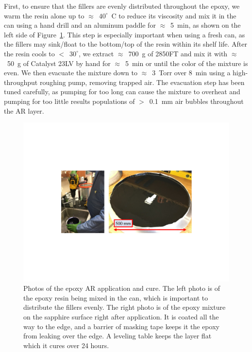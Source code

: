 First, to ensure that the fillers are evenly distributed throughout the epoxy, we warm the resin alone up to $\approx$~$40^{\circ}$~C to reduce its viscosity and mix it in the can using a hand drill and an aluminum paddle for $\approx$~5~min, as shown on the left side of Figure~\ref{fig:epoxy_curing}. This step is especially important when using a fresh can, as the fillers may sink/float to the bottom/top of the resin within its shelf life. After the resin cools to $<$~$30^{\circ}$, we extract $\approx$~700~g of 2850FT and mix it with $\approx$~50~g of Catalyst 23LV by hand for $\approx$~5~min or until the color of the mixture is even. We then evacuate the mixture down to $\approx$~3~Torr over 8~min using a high-throughput roughing pump, removing trapped air. The evacuation step has been tuned carefully, as pumping for too long can cause the mixture to overheat and pumping for too little results populations of $>$~0.1~mm air bubbles throughout the AR layer.

\begin{figure}[!t]
    \centering
    \includegraphics[width=0.7\linewidth, trim=5cm 6.5cm 5cm 6.5cm, clip]{ARCoating/Figures/epoxy_curing.pdf}
    \caption[Photos of the epoxy AR application and cure.]{Photos of the epoxy AR application and cure. The left photo is of the epoxy resin being mixed in the can, which is important to distribute the fillers evenly. The right photo is of the epoxy mixture on the sapphire surface right after application. It is coated all the way to the edge, and a barrier of masking tape keeps it the epoxy from leaking over the edge. A leveling table keeps the layer flat which it cures over 24 hours.}
    \label{fig:epoxy_curing}
\end{figure}

